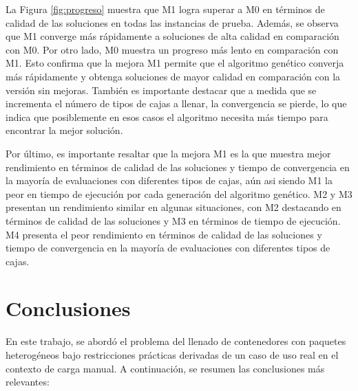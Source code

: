 \documentclass[openany]{article}
\begin{document}
La Figura \ref{fig:progreso} muestra que M1 logra superar a M0 en términos de calidad de las soluciones en todas las instancias de prueba. Además, se observa que M1 converge más rápidamente a soluciones de alta calidad en comparación con M0. Por otro lado, M0 muestra un progreso más lento en comparación con M1. Esto confirma que la mejora M1 permite que el algoritmo genético converja más rápidamente y obtenga soluciones de mayor calidad en comparación con la versión sin mejoras. También es importante destacar que a medida que se incrementa el número de tipos de cajas a llenar, la convergencia se pierde, lo que indica que posiblemente en esos casos el algoritmo necesita más tiempo para encontrar la mejor solución.

Por último, es importante resaltar que la mejora M1 es la que muestra mejor rendimiento en términos de calidad de las soluciones y tiempo de convergencia en la mayoría de evaluaciones con diferentes tipos de cajas, aún asi siendo M1 la peor en tiempo de ejecución por cada generación del algoritmo genético. M2 y M3 presentan un rendimiento similar en algunas situaciones, con M2 destacando en términos de calidad de las soluciones y M3 en términos de tiempo de ejecución. M4 presenta el peor rendimiento en términos de calidad de las soluciones y tiempo de convergencia en la mayoría de evaluaciones con diferentes tipos de cajas.









\newpage








\section{Conclusiones}

En este trabajo, se abordó el problema del llenado de contenedores con paquetes heterogéneos bajo restricciones prácticas derivadas de un caso de uso real en el contexto de carga manual. A continuación, se resumen las conclusiones más relevantes:
\end{document}
